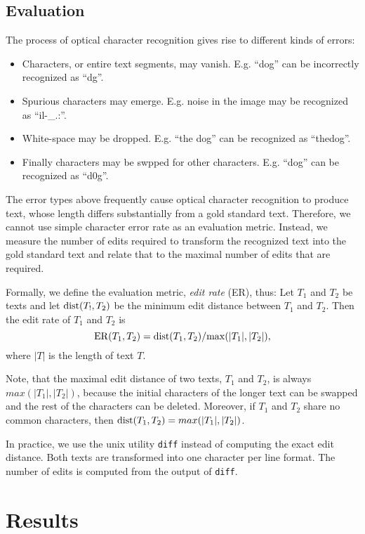 \documentclass[b5paper]{article}
\begin{document}
\subsection{Evaluation}
The process of optical character recognition gives rise to different kinds of errors:
\begin{itemize}
\item Characters, or entire text segments, may vanish. E.g. ``dog'' can be incorrectly recognized as ``dg''.
\item Spurious characters may emerge. E.g. noise in the image may be recognized as ``il-\_.:''. 
\item White-space may be dropped. E.g. ``the dog'' can be recognized as ``thedog''.
\item Finally characters may be swpped for other
  characters. E.g. ``dog'' can be recognized as ``d0g''.
\end{itemize}

The error types above frequently cause optical character recognition
to produce text, whose length differs substantially from a gold
standard text. Therefore, we cannot use simple character error rate as
an evaluation metric. Instead, we measure the number of edits required
to transform the recognized text into the gold standard text and
relate that to the maximal number of edits that are required.

Formally, we define the evaluation metric, {\it edit rate} (ER), thus:
Let $T_1$ and $T_2$ be texts and let ${\rm dist}(T_!, T_2)$ be the
minimum edit distance \cite{levenshtein66} between $T_1$ and $T_2$. Then the edit
rate of $T_1$ and $T_2$ is
$${\rm ER}(T_1, T_2) = {\rm dist}(T_1, T_2) / {\rm max}(|T_1|, |T_2|){\rm ,}$$
where $|T|$ is the length of text $T$.
 
Note, that the maximal edit distance of two texts, $T_1$ and $T_2$, is
always $max(|T_1|, |T_2|)$, because the initial characters of the
longer text can be swapped and the rest of the characters can be
deleted. Moreover, if $T_1$ and $T_2$ share no common characters, then
${\rm dist}(T_1, T_2) = max(|T_1|, |T_2|)$.

In practice, we use the unix utility {\tt diff} instead of computing
the exact edit distance. Both texts are transformed into one character
per line format. The number of edits is computed from the output of
{\tt diff}.

\section{Results}
\end{document}
